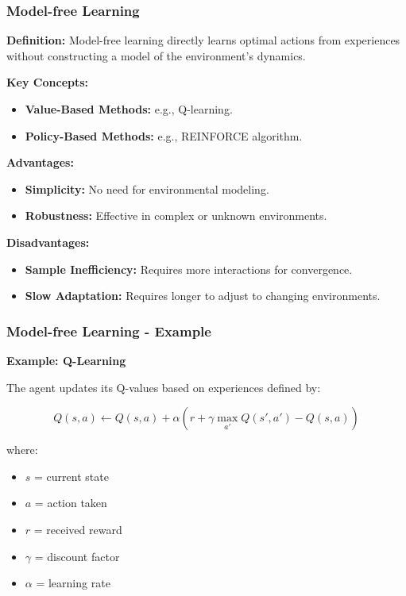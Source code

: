 \documentclass[aspectratio=169]{beamer}
\begin{document}
\begin{frame}[fragile]
    \frametitle{Model-free Learning}
    
    \textbf{Definition:} 
    Model-free learning directly learns optimal actions from experiences without constructing a model of the environment's dynamics.

    \textbf{Key Concepts:}
    \begin{itemize}
        \item \textbf{Value-Based Methods:} e.g., Q-learning.
        \item \textbf{Policy-Based Methods:} e.g., REINFORCE algorithm.
    \end{itemize}

    \textbf{Advantages:}
    \begin{itemize}
        \item \textbf{Simplicity:} No need for environmental modeling.
        \item \textbf{Robustness:} Effective in complex or unknown environments.
    \end{itemize}

    \textbf{Disadvantages:}
    \begin{itemize}
        \item \textbf{Sample Inefficiency:} Requires more interactions for convergence.
        \item \textbf{Slow Adaptation:} Requires longer to adjust to changing environments.
    \end{itemize}
\end{frame}

\begin{frame}[fragile]
    \frametitle{Model-free Learning - Example}

    \textbf{Example: Q-Learning}
    
    The agent updates its Q-values based on experiences defined by:
    
    \begin{equation}
        Q(s, a) \leftarrow Q(s, a) + \alpha \left( r + \gamma \max_{a'} Q(s', a') - Q(s, a) \right)
    \end{equation}
    
    where:
    \begin{itemize}
        \item $s$ = current state
        \item $a$ = action taken
        \item $r$ = received reward
        \item $\gamma$ = discount factor
        \item $\alpha$ = learning rate
    \end{itemize}
\end{frame}
\end{document}
